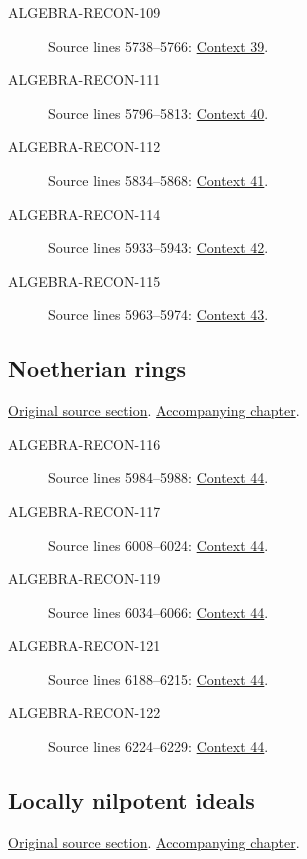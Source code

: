 \begin{description}
\item[ALGEBRA-RECON-109] Source lines 5738--5766: \hyperlink{algebra-context-039}{Context 39}.
\item[ALGEBRA-RECON-111] Source lines 5796--5813: \hyperlink{algebra-context-040}{Context 40}.
\item[ALGEBRA-RECON-112] Source lines 5834--5868: \hyperlink{algebra-context-041}{Context 41}.
\item[ALGEBRA-RECON-114] Source lines 5933--5943: \hyperlink{algebra-context-042}{Context 42}.
\item[ALGEBRA-RECON-115] Source lines 5963--5974: \hyperlink{algebra-context-043}{Context 43}.
\end{description}

\subsection{Noetherian rings}
\hypertarget{algebra-source-section-Noetherian}{}
\noindent\href{https://github.com/stacks/stacks-project/blob/a04446e57ec1fbc252a871afcec7752fb2807b14/algebra.tex\#L5980}{Original source section}. \href{algebra.pdf\#nameddest=section-Noetherian}{Accompanying chapter}.

\begin{description}
\item[ALGEBRA-RECON-116] Source lines 5984--5988: \hyperlink{algebra-context-044}{Context 44}.
\item[ALGEBRA-RECON-117] Source lines 6008--6024: \hyperlink{algebra-context-044}{Context 44}.
\item[ALGEBRA-RECON-119] Source lines 6034--6066: \hyperlink{algebra-context-044}{Context 44}.
\item[ALGEBRA-RECON-121] Source lines 6188--6215: \hyperlink{algebra-context-044}{Context 44}.
\item[ALGEBRA-RECON-122] Source lines 6224--6229: \hyperlink{algebra-context-044}{Context 44}.
\end{description}

\subsection{Locally nilpotent ideals}
\hypertarget{algebra-source-section-locally-nilpotent}{}
\noindent\href{https://github.com/stacks/stacks-project/blob/a04446e57ec1fbc252a871afcec7752fb2807b14/algebra.tex\#L6238}{Original source section}. \href{algebra.pdf\#nameddest=section-locally-nilpotent}{Accompanying chapter}.

